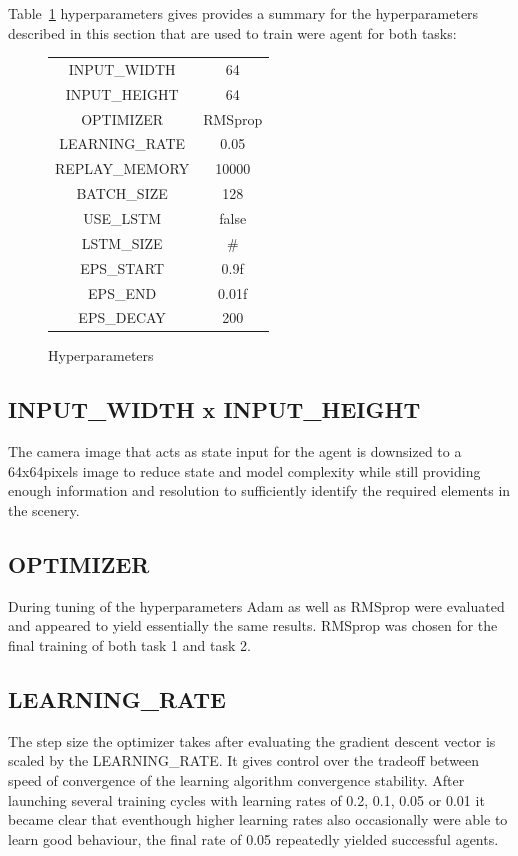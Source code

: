 \documentclass[10pt,journal,compsoc]{IEEEtran}
\begin{document}
Table~\ref{tab:hyperparameters} hyperparameters gives provides a summary for the hyperparameters described in this section that are used to train were agent for both tasks:
\begin{figure}[thpb]
    \centering
    \begin{tabular}{|c|c|}\hline
        INPUT\_WIDTH  & 64  \\ 
        INPUT\_HEIGHT & 64  \\ 
        OPTIMIZER & RMSprop  \\ 
        LEARNING\_RATE & 0.05 \\ 
        REPLAY\_MEMORY & 10000  \\ 
        BATCH\_SIZE & 128  \\ 
        USE\_LSTM & false  \\ 
        LSTM\_SIZE & \# \\ \hline

        EPS\_START  & 0.9f \\
        EPS\_END  & 0.01f \\
        EPS\_DECAY  & 200 \\
        \hline
    \end{tabular}
    \caption{Hyperparameters}
    \label{tab:hyperparameters}
\end{figure}

\subsection*{INPUT\_WIDTH x INPUT\_HEIGHT} 
The camera image that acts as state input for the agent is downsized to a 64x64pixels image to reduce state and model complexity while still providing enough information and resolution to sufficiently identify the required elements in the scenery.

\subsection*{OPTIMIZER}
During tuning of the hyperparameters Adam as well as RMSprop were evaluated and appeared to yield essentially the same results. RMSprop was chosen for the final training of both task 1 and task 2.

\subsection*{LEARNING\_RATE} 
The step size the optimizer takes after evaluating the gradient descent vector is scaled by the LEARNING\_RATE. It gives control over the tradeoff between speed of convergence of the learning algorithm convergence stability. After launching several training cycles with learning rates of 0.2, 0.1, 0.05 or 0.01 it became clear that eventhough higher learning rates also occasionally were able to learn good behaviour, the final rate of 0.05 repeatedly yielded successful agents.
\end{document}
